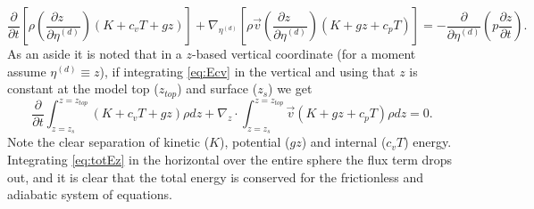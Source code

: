 \documentclass{agujournal}
\begin{document}
{\begin{equation}
\frac{\partial }{\partial t}\left[ \rho \left( \frac{\partial z\quad }{\partial \eta^{(d)}}\right)\left(K+c_vT+gz\right)\right]+\nabla_{\eta^{(d)}} \left[ \rho \vec{v} \left( \frac{\partial z\quad }{\partial \eta^{(d)}}\right) \left( K+gz+c_pT \right) \right]=-\frac{\partial}{\partial \eta^{(d)}}\left( p\frac{\partial z}{\partial t}\right).\label{eq:Ecv}
\end{equation}
As an aside it is noted that in a $z$-based vertical coordinate (for a moment assume $\eta^{(d)}\equiv z$), if integrating \eqref{eq:Ecv} in the vertical and using that $z$ is constant at the model top ($z_{top}$) and surface ($z_s$) we get
\begin{equation}
\frac{\partial }{\partial t}\int_{z=z_s}^{z=z_{top}}\left(K+c_vT+gz\right)\rho dz+\nabla_z \cdot \int_{z=z_s}^{z=z_{top}} \vec{v} \left( K+gz+c_pT \right) \rho dz=0.\label{eq:totEz}
\end{equation}
Note the clear separation of kinetic ($K$), potential ($gz$) and internal ($c_vT$) energy. Integrating \eqref{eq:totEz} in the horizontal over the entire sphere the flux term drops out, and it is clear that the total energy is conserved for the frictionless and adiabatic system of equations.

}
\end{document}
